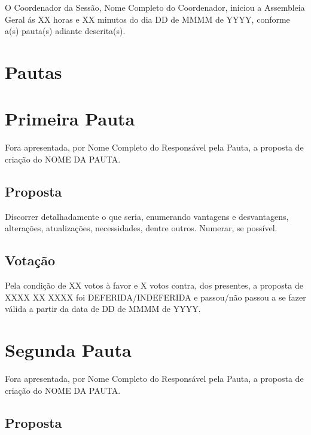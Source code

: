 \documentclass[12pt]{article}
\begin{document}
\dividerline

\tableofcontents

\hbox{}
\dividerline



O Coordenador da Sessão, Nome Completo do Coordenador,  iniciou a Assembleia Geral ás XX horas e XX minutos do dia DD de MMMM de YYYY, conforme a(s) pauta(s) adiante descrita(s).

\section*{Pautas}

\section{Primeira Pauta}

Fora apresentada, por Nome Completo do Responsável pela Pauta, a proposta de criação do NOME DA PAUTA.

\subsection*{Proposta}

Discorrer detalhadamente o que seria, enumerando vantagens e desvantagens, alterações, atualizações, necessidades, dentre outros. 
Numerar, se possível.

\subsection*{Votação}

Pela condição de XX votos à favor e X votos contra, dos presentes, a proposta de XXXX XX XXXX foi DEFERIDA/INDEFERIDA e passou/não passou a se fazer válida a partir da data de DD de MMMM de YYYY.

\section{Segunda Pauta}

Fora apresentada, por Nome Completo do Responsável pela Pauta, a proposta de criação do NOME DA PAUTA.

\subsection*{Proposta}
\end{document}
